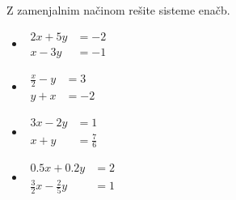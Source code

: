         
            \begin{naloga}
                Z zamenjalnim načinom rešite sisteme enačb.
                \begin{itemize}
                    
                        \item $\begin{aligned}
                            2x+5y&=-2 \\ x-3y&=-1
                        \end{aligned}$ 
                        \item $\begin{aligned}
                            \frac{x}{2}-y&=3 \\ y+x&=-2
                        \end{aligned}$ 
                        \item $\begin{aligned}
                            3x-2y&=1 \\ x+y&=\frac{7}{6}
                        \end{aligned}$ 
                        \item $\begin{aligned}
                            0.5x+0.2y&=2 \\ \frac{3}{2}x-\frac{2}{5}y&=1
                        \end{aligned}$ 
                    

                \end{itemize}
            \end{naloga}
        



